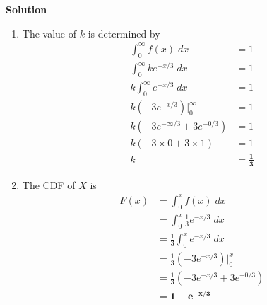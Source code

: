 \documentclass{uofa-eng-assignment}
\begin{document}
\begin{enumerate}
\begin{enumerate}
        \end{enumerate}
        \textbf{Solution}
        \begin{enumerate}
            \item The value of $k$ is determined by
                  \begin{align*}
                      \int_{0}^{\infty} f(x)\; dx                & = 1                        \\
                      \int_{0}^{\infty} ke^{-x/3}\; dx           & = 1                        \\
                      k \int_{0}^{\infty} e^{-x/3}\; dx          & = 1                        \\
                      k \left(-3e^{-x/3}\right) \Big|_0^\infty   & = 1                        \\
                      k \left(-3e^{-\infty/3} + 3e^{-0/3}\right) & = 1                        \\
                      k \left(-3 \times 0 + 3 \times 1\right)    & = 1                        \\
                      k                                          & = \boldsymbol{\frac{1}{3}}
                  \end{align*}
            \item The CDF of $X$ is
                  \begin{align*}
                      F(x) & = \int_{0}^{x} f(x)\; dx                          \\
                           & = \int_{0}^{x} \frac{1}{3}e^{-x/3}\; dx           \\
                           & = \frac{1}{3} \int_{0}^{x} e^{-x/3}\; dx          \\
                           & = \frac{1}{3} \left(-3e^{-x/3}\right) \Big|_0^x   \\
                           & = \frac{1}{3} \left(-3e^{-x/3} + 3e^{-0/3}\right) \\
                           & = \boldsymbol{1 - e^{-x/3}}
                  \end{align*}
        \end{enumerate}

\end{enumerate}
\end{document}
